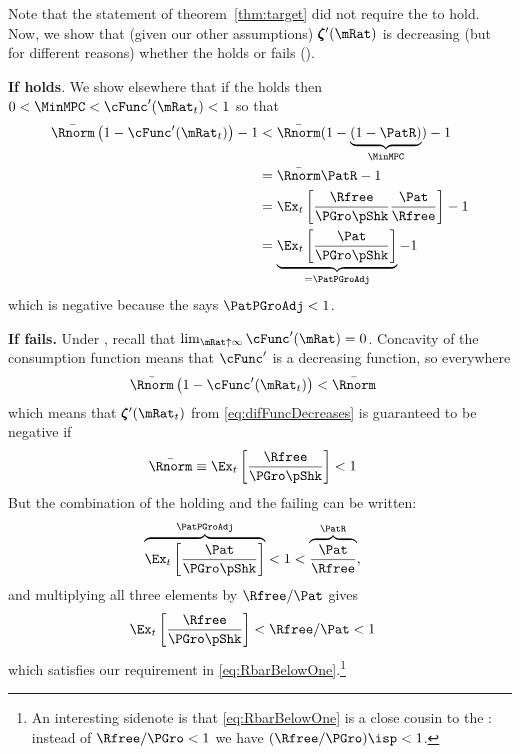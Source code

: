 \documentclass[BufferStockTheory]{subfiles}
\begin{document}
Note that the statement of theorem~\ref{thm:target} did not require the {\RIC} to hold.  Now, we show that (given our other assumptions) $\difFunc^{\prime}(\mRat)$ is decreasing (but for different reasons) whether the {\RIC} holds or fails (\cncl{\RIC}).

\textbf{If {\RIC} holds}.   We show elsewhere that if the {\RIC} holds then $0 < \MinMPC < \cFunc^{\prime}(\mRat_{t}) < 1$ so that 
\begin{align*}
\bar{\Rnorm}\left(1-\cFunc^{\prime}({\mRat}_t)\right) - 1 & <  \bar{\Rnorm}(1-\underbrace{(1-\PatR)}_{\MinMPC}) - 1  \\
                                                          & = \bar{\Rnorm}\PatR - 1 \\
                                                          & = \Ex_{t}\left[\frac{\Rfree}{\PGro \pShk}\frac{\Pat}{\Rfree}\right] - 1 \\
                                                          & = \underbrace{\Ex_{t}\left[\frac{\Pat}{\PGro \pShk}\right]}_{= \PatPGroAdj} - 1 
\end{align*}
which is negative because the {\GIC} says $\PatPGroAdj < 1$.  

\textbf{If {\RIC} fails.}
Under \cncl{\RIC}, recall that $\lim_{\mRat \uparrow \infty} \cFunc^{\prime}(\mRat) = 0$.  Concavity of the consumption function means that $\cFunc^{\prime}$ is a decreasing function, so everywhere 
\begin{align*}
 \bar{\Rnorm}\left(1-\cFunc^{\prime}({\mRat}_t)\right) & < \bar{\Rnorm}
\end{align*}
which means that $\difFunc^{\prime}(\mRat_{t})$ from \eqref{eq:difFuncDecreases} is guaranteed to be negative if
\begin{align}
  \bar{\Rnorm} \equiv \Ex_{t}\left[\frac{\Rfree}{\PGro \pShk}\right] & < 1  \label{eq:RbarBelowOne}
\end{align}
But the combination of the {\GIC} holding and the {\RIC} failing can be written:
\begin{align*}
  \overbrace{\Ex_{t}\left[\frac{\Pat}{\PGro \pShk}\right]}^{\PatPGroAdj} & < 1 < \overbrace{\frac{\Pat}{\Rfree}}^{{\PatR}},
\end{align*}
and multiplying all three elements by $\Rfree/\Pat$ gives 
\begin{align*}
  \Ex_{t}\left[\frac{\Rfree}{\PGro \pShk}\right] & < \Rfree/\Pat < 1
\end{align*}
which satisfies our requirement in \eqref{eq:RbarBelowOne}.\footnote{An interesting sidenote is that \eqref{eq:RbarBelowOne} is a close cousin to the {\FHWC}: instead of $\Rfree/\PGro < 1$ we have $(\Rfree/\PGro)\isp < 1$.}
\end{document}
